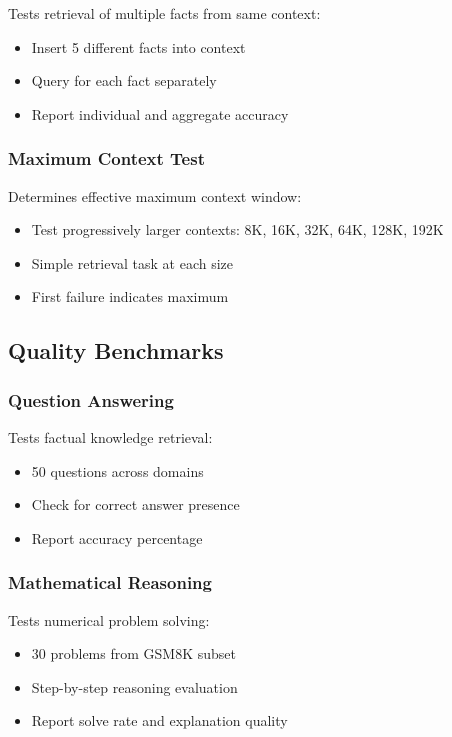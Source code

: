 Tests retrieval of multiple facts from same context:

\begin{itemize}
    \item Insert 5 different facts into context
    \item Query for each fact separately
    \item Report individual and aggregate accuracy
\end{itemize}

\subsubsection{Maximum Context Test}

Determines effective maximum context window:

\begin{itemize}
    \item Test progressively larger contexts: 8K, 16K, 32K, 64K, 128K, 192K
    \item Simple retrieval task at each size
    \item First failure indicates maximum
\end{itemize}

\subsection{Quality Benchmarks}

\subsubsection{Question Answering}

Tests factual knowledge retrieval:

\begin{itemize}
    \item 50 questions across domains
    \item Check for correct answer presence
    \item Report accuracy percentage
\end{itemize}

\subsubsection{Mathematical Reasoning}

Tests numerical problem solving:

\begin{itemize}
    \item 30 problems from GSM8K subset
    \item Step-by-step reasoning evaluation
    \item Report solve rate and explanation quality
\end{itemize}

